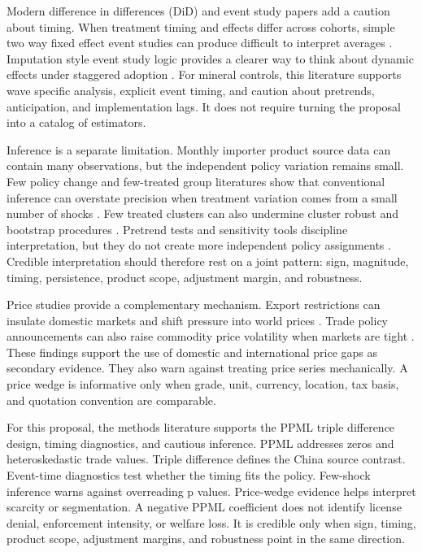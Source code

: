 \documentclass[12pt,a4paper]{article}
\numberwithin{equation}{section}
\begin{document}
Modern difference in differences (DiD) and event study papers add a caution about timing. When treatment timing and effects differ across cohorts, simple two way fixed effect event studies can produce difficult to interpret averages \citep{callaway2021difference,sun2021eventstudies,dechaisemartin2020twfe}. Imputation style event study logic provides a clearer way to think about dynamic effects under staggered adoption \citep{borusyak_jaravel_spiess2024_event_studies}. For mineral controls, this literature supports wave specific analysis, explicit event timing, and caution about pretrends, anticipation, and implementation lags. It does not require turning the proposal into a catalog of estimators.

Inference is a separate limitation. Monthly importer product source data can contain many observations, but the independent policy variation remains small. Few policy change and few-treated group literatures show that conventional inference can overstate precision when treatment variation comes from a small number of shocks \citep{conley_taber2011_small_policy_changes,ferman_pinto2019_few_treated}. Few treated clusters can also undermine cluster robust and bootstrap procedures \citep{mackinnon_webb2018_few_treated_clusters}. Pretrend tests and sensitivity tools discipline interpretation, but they do not create more independent policy assignments \citep{roth2022pretest,rambachan2023honest}. Credible interpretation should therefore rest on a joint pattern: sign, magnitude, timing, persistence, product scope, adjustment margin, and robustness.

Price studies provide a complementary mechanism. Export restrictions can insulate domestic markets and shift pressure into world prices \citep{martin_anderson2012_price_insulation}. Trade policy announcements can also raise commodity price volatility when markets are tight \citep{brander_bernauer_huss2023_trade_policy_volatility}. These findings support the use of domestic and international price gaps as secondary evidence. They also warn against treating price series mechanically. A price wedge is informative only when grade, unit, currency, location, tax basis, and quotation convention are comparable.

For this proposal, the methods literature supports the PPML triple difference design, timing diagnostics, and cautious inference. PPML addresses zeros and heteroskedastic trade values. Triple difference defines the China source contrast. Event-time diagnostics test whether the timing fits the policy. Few-shock inference warns against overreading p values. Price-wedge evidence helps interpret scarcity or segmentation. A negative PPML coefficient does not identify license denial, enforcement intensity, or welfare loss. It is credible only when sign, timing, product scope, adjustment margins, and robustness point in the same direction.
\end{document}
